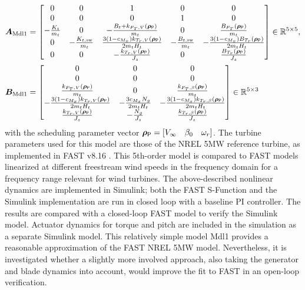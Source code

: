\begin{align*}
    \bm{A}_{\text{Mdl1}} &= \begin{bmatrix}
        0 & 0 & 1 & 0 & 0 \\
        0 & 0 & 0 & 1 & 0 \\
        - \frac{K_t}{m_t} & 0 & -\frac{B_t+ k_{F_T,V}(\bm{\rho}_{\mathsf{P}})}{m_t} & 0 & \frac{B_{F_T}(\bm{\rho}_{\mathsf{P}})}{m_t} \\
        0 &  - \frac{K_{t,\text{sw}}}{m_t}  & \frac{3(1-c_{M_x})k_{T_r,V}(\bm{\rho}_{\mathsf{P}})}{2 m_t H_t} & - \frac{B_{t,\text{sw}}}{m_t} & -\frac{3(1-c_{M_x})B_{T_r}(\bm{\rho}_{\mathsf{P}})}{2 m_t H_t} \\
        0 & 0 & - \frac{k_{T_r,V}(\bm{\rho}_{\mathsf{P}})}{J_s} & 0 & \frac{B_{T_r}(\bm{\rho}_{\mathsf{P}})}{J_s}
    \end{bmatrix}  \in \mathbb{R}^{5 \times 5},\\
    \bm{B}_{\text{Mdl1}} &= \begin{bmatrix}
        0 & 0 & 0 \\
        0 & 0 & 0 \\
        \frac{k_{F_T,V}(\bm{\rho}_{\mathsf{P}})}{m_t} & 0 & \frac{k_{F_T,\beta}(\bm{\rho}_{\mathsf{P}})}{m_t} \\
        -\frac{3(1-c_{M_x})k_{T_r,V}(\bm{\rho}_{\mathsf{P}})}{2 m_t H_t} & -\frac{3 c_{M_x} N_g}{2 m_t H_t} &  -\frac{3(1-c_{M_x})k_{T_r,\beta}(\bm{\rho}_{\mathsf{P}})}{2 m_t H_t}\\
        \frac{k_{T_r,V}(\bm{\rho}_{\mathsf{P}})}{J_s} & -\frac{N_g}{J_s} &  \frac{k_{T_r,\beta}(\bm{\rho}_{\mathsf{P}})}{J_s}
    \end{bmatrix}  \in \mathbb{R}^{5 \times 3}
\end{align*} \enlargethispage{\baselineskip}
with the scheduling parameter vector $\bm{\rho}_{\mathsf{P}} = \left[V_{\infty}\quad \beta_0 \quad \omega_r\right]$. The turbine parameters used for this model are those of the NREL 5MW reference turbine, as implemented in FAST v8.16 \cite{jonkman2016fast}. 
%
This 5th-order model is compared to FAST models linearized at different freestream wind speeds in the frequency domain for a frequency range relevant for wind turbines. The above-described nonlinear dynamics are implemented in Simulink; both the FAST S-Function and the Simulink implementation are run in closed loop with a baseline PI controller. The results are compared with a closed-loop FAST model to verify the Simulink model. Actuator dynamics for torque and pitch are included in the simulation as a separate Simulink model.
%
This relatively simple model Mdl1 provides a reasonable approximation of the FAST NREL 5MW model. Nevertheless, it is investigated whether a slightly more involved approach, also taking the generator and blade dynamics into account, would improve the fit to FAST in an open-loop verification.

